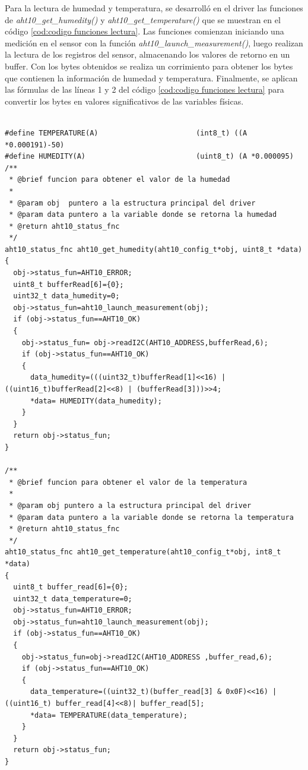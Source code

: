 Para la lectura de humedad y temperatura, se desarrolló en el driver las funciones de \emph{aht10\_get\_humedity()} y \emph{aht10\_get\_temperature()} que se muestran en el código \ref{cod:codigo funciones lectura}.
Las funciones comienzan iniciando una medición en el sensor con la función \emph{aht10\_launch\_measurement()}, luego realizan la lectura de los registros del sensor, almacenando los valores de retorno en un buffer. Con los bytes obtenidos se realiza un corrimiento para  obtener los bytes que contienen la información de humedad y temperatura. Finalmente, se aplican las fórmulas de las líneas 1 y 2 del código \ref{cod:codigo funciones lectura} para convertir los bytes en valores significativos de las variables físicas.
\begin{lstlisting}[label=cod:codigo funciones lectura ,caption=Funciones de lectura de humedad y temperatura.]  % Start your code-block

#define TEMPERATURE(A)                       (int8_t) ((A *0.000191)-50)       
#define HUMEDITY(A)                          (uint8_t) (A *0.000095)        
/**
 * @brief funcion para obtener el valor de la humedad
 * 
 * @param obj  puntero a la estructura principal del driver 
 * @param data puntero a la variable donde se retorna la humedad
 * @return aht10_status_fnc 
 */
aht10_status_fnc aht10_get_humedity(aht10_config_t*obj, uint8_t *data)
{
  obj->status_fun=AHT10_ERROR;
  uint8_t bufferRead[6]={0};
  uint32_t data_humedity=0;
  obj->status_fun=aht10_launch_measurement(obj);
  if (obj->status_fun==AHT10_OK)
  {
    obj->status_fun= obj->readI2C(AHT10_ADDRESS,bufferRead,6);
    if (obj->status_fun==AHT10_OK)
    {
      data_humedity=(((uint32_t)bufferRead[1]<<16) | ((uint16_t)bufferRead[2]<<8) | (bufferRead[3]))>>4;
      *data= HUMEDITY(data_humedity);
    }
  }
  return obj->status_fun;
}

/**
 * @brief funcion para obtener el valor de la temperatura
 * 
 * @param obj puntero a la estructura principal del driver 
 * @param data puntero a la variable donde se retorna la temperatura
 * @return aht10_status_fnc 
 */
aht10_status_fnc aht10_get_temperature(aht10_config_t*obj, int8_t *data)
{
  uint8_t buffer_read[6]={0};
  uint32_t data_temperature=0;
  obj->status_fun=AHT10_ERROR;
  obj->status_fun=aht10_launch_measurement(obj);
  if (obj->status_fun==AHT10_OK)
  {
    obj->status_fun=obj->readI2C(AHT10_ADDRESS ,buffer_read,6);
    if (obj->status_fun==AHT10_OK)
    {
      data_temperature=((uint32_t)(buffer_read[3] & 0x0F)<<16) | ((uint16_t) buffer_read[4]<<8)| buffer_read[5];
      *data= TEMPERATURE(data_temperature);
    }
  }
  return obj->status_fun;
}
\end{lstlisting}

